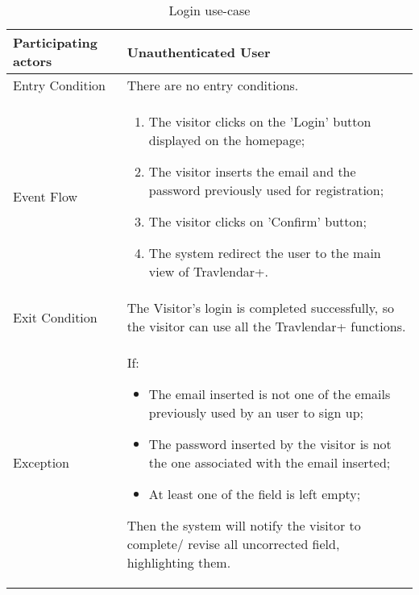 \begin{table}[H]
	\begin{center}
		\begin{tabular}{ | p{} | p{} | }
		\hline
		Participating actors & Unauthenticated User\\
		\hline
		Entry Condition & There are no entry conditions.\\
		\hline
		Event Flow & 
			\begin{enumerate}
				\item The visitor clicks on the 'Login' button displayed on the homepage;
				\item The visitor inserts the email and the password previously used for registration;
				\item The visitor clicks on 'Confirm' button;
				\item The system redirect the user to the main view of Travlendar+.
			\end{enumerate} \\
		\hline
		Exit Condition & The Visitor’s login is completed successfully, so the visitor can use all the Travlendar+ functions. \\
		\hline
		Exception & If:
				\begin{itemize}
   					\item The email inserted is not one of the emails previously used by an user to sign up;
   					\item The password inserted by the visitor is not the one associated with the email inserted;
   					\item At least one of the field is left empty;
   				\end{itemize}
   		Then the system will notify the visitor to complete/ revise all uncorrected field, highlighting them.\\ 
		\hline
		\end{tabular}
	\end{center}
	\caption{Login use-case}
\end{table}